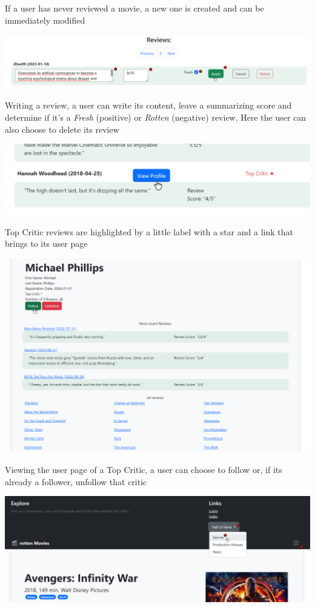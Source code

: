If a user has never reviewed a movie, a new one is created and can be immediately modified

\includegraphics[scale=0.45]{../../../images/user_manual/write_review.png} 

Writing a review, a user can write its content, leave a summarizing score and determine if it's a \textit{Fresh} (positive) or \textit{Rotten} (negative) review. Here the user can also choose to delete its review

\includegraphics[scale=0.45]{../../../images/user_manual/view_profile_of_top_critic.png} 

Top Critic reviews are highlighted by a little label with a star and a link that brings to its user page

\includegraphics[scale=0.45]{../../../images/user_manual/follow_top_critic.png} 

Viewing the user page of a Top Critic, a user can choose to follow or, if its already a follower, unfollow that critic


\includegraphics[scale=0.45]{../../../images/user_manual/unregistered_navbar.png} 

